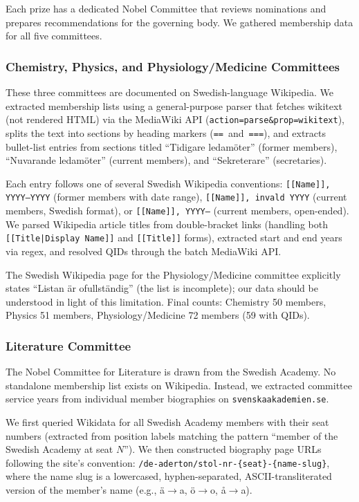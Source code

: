 Each prize has a dedicated Nobel Committee that reviews nominations and
prepares recommendations for the governing body. We gathered membership
data for all five committees.

\subsubsection{Chemistry, Physics, and Physiology/Medicine Committees}

These three committees are documented on Swedish-language Wikipedia. We
extracted membership lists using a general-purpose parser that fetches
wikitext (not rendered HTML) via the MediaWiki API
(\texttt{action=parse\&prop=wikitext}), splits the text into sections by
heading markers (\texttt{==}~and~\texttt{===}), and extracts bullet-list
entries from sections titled ``Tidigare ledam\"oter'' (former members),
``Nuvarande ledam\"oter'' (current members), and
``Sekreterare'' (secretaries).

Each entry follows one of several Swedish Wikipedia conventions:
\texttt{[[Name]], YYYY--YYYY} (former members with date range),
\texttt{[[Name]], invald YYYY} (current members, Swedish format), or
\texttt{[[Name]], YYYY--} (current members, open-ended). We parsed
Wikipedia article titles from double-bracket links (handling both
\texttt{[[Title|Display Name]]} and \texttt{[[Title]]} forms), extracted
start and end years via regex, and resolved QIDs through the batch
MediaWiki API.

The Swedish Wikipedia page for the Physiology/Medicine committee explicitly
states ``Listan \"ar ofullst\"andig'' (the list is incomplete); our data
should be understood in light of this limitation. Final counts: Chemistry 50
members, Physics 51 members, Physiology/Medicine 72 members (59 with QIDs).

\subsubsection{Literature Committee}

The Nobel Committee for Literature is drawn from the Swedish Academy.
No standalone membership list exists on Wikipedia. Instead, we extracted
committee service years from individual member biographies on
\texttt{svenskaakademien.se}.

We first queried Wikidata for all Swedish Academy members with their
seat numbers (extracted from position labels matching the pattern
``member of the Swedish Academy at seat $N$''). We then constructed
biography page URLs following the site's convention:
\texttt{/de-aderton/stol-nr-\{seat\}-\{name-slug\}}, where the name
slug is a lowercased, hyphen-separated, ASCII-transliterated version
of the member's name (e.g., \"a$\to$a, \"o$\to$o, \aa$\to$a).


